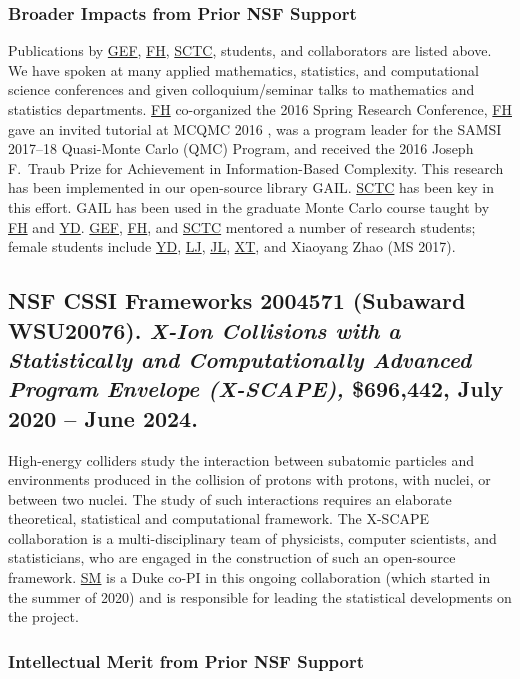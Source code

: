 \documentclass[11pt]{NSFamsart}
\newcommand{\cmtS}[1]{{\color{blue}{(Simon: #1)}}}
\newcommand{\FH}{\hyperlink{FHlink}{FH}\xspace}
\newcommand{\SM}{\hyperlink{SMlink}{SM}\xspace}
\newcommand{\SCTC}{\hyperlink{SCTClink}{SCTC}\xspace}
\newcommand{\GEF}{\hyperlink{GEFlink}{GEF}\xspace}
\newcommand{\YD}{\hyperlink{YDlink}{YD}\xspace}
\newcommand{\LJ}{\hyperlink{LJlink}{LJ}\xspace}
\newcommand{\XT}{\hyperlink{XTlink}{XT}\xspace}
\newcommand{\JL}{\hyperlink{JLlink}{JL}\xspace}
\newcommand{\GAIL}{GAIL\xspace}
\begin{document}
\subsubsection{Broader Impacts from Prior NSF Support} \label{prevBIsect}
Publications by \GEF, \FH,  \SCTC, students, and collaborators are listed above.  We have spoken at many applied mathematics, statistics,
and computational science conferences and given colloquium/seminar talks to mathematics and
statistics departments.  \FH co-organized the
2016 Spring Research
Conference, \FH gave an invited tutorial
at MCQMC 2016
\cite{Hic17a}, was a program leader for the SAMSI 2017--18 Quasi-Monte Carlo (QMC) Program, and received the 2016 Joseph F.\ Traub Prize for Achievement in Information-Based Complexity.  This research has been implemented in our open-source library
\GAIL \cite{ChoEtal21a}.  \SCTC has been key in this effort.  \GAIL has been used in the graduate Monte Carlo course taught by \FH and \YD. \GEF, \FH, and \SCTC mentored a number of
research students;  female students include \YD, \LJ, \JL, \XT, and Xiaoyang Zhao (MS 2017).



\subsection{NSF CSSI Frameworks 2004571 (Subaward WSU20076). \cmtS{to add} \textit{X-Ion Collisions with a Statistically and Computationally Advanced Program Envelope (X-SCAPE),} \$696,442, July 2020 -- June 2024.} High-energy colliders study the interaction between subatomic particles and environments produced in the collision of protons with protons, with nuclei, or between two nuclei. The study of such interactions requires an elaborate theoretical, statistical and computational framework. The X-SCAPE collaboration is a multi-disciplinary team of physicists, computer scientists, and statisticians, who are engaged in the construction of such an open-source framework. \SM is a Duke co-PI in this ongoing collaboration (which started in the summer of 2020) and is responsible for leading the statistical developments on the project.

\subsubsection{Intellectual Merit from Prior NSF Support}
\end{document}
